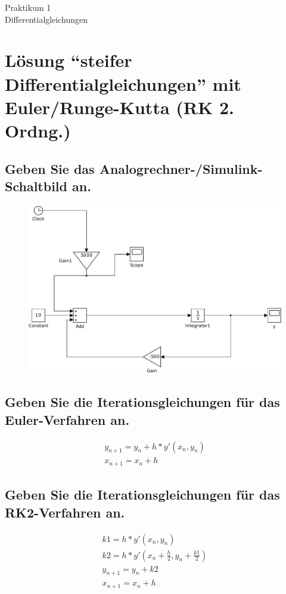 \documentclass[10pt,a4paper]{article}
\begin{document}
\begin{center}
\begin{LARGE}
Praktikum 1\\
Differentialgleichungen
\end{LARGE}
\end{center}

\section{Lösung  "`steifer Differentialgleichungen"' mit Euler/Runge-Kutta (RK 2. Ordng.)}

\subsection{Geben Sie das Analogrechner-/Simulink-Schaltbild an.}
\begin{figure}[H]
\centering
\includegraphics[width=0.9\linewidth]{../screenshots/1}
\end{figure}
\subsection{Geben Sie die Iterationsgleichungen für das Euler-Verfahren an.}
\begin{subequations}
\begin{align}
y_{n+1} = y_n + h * y'(x_n,y_n)\\
x_{n+1} = x_n + h
\end{align}
\end{subequations}

\subsection{Geben Sie die Iterationsgleichungen für das RK2-Verfahren an.}
\begin{subequations}
\begin{align}
k1 = h * y'(x_n,y_n)\\
k2 = h * y'(x_n + \frac{h}{2},y_n + \frac{k1}{2})\\
y_{n+1} = y_n + k2\\
x_{n+1} = x_n + h
\end{align}
\end{subequations}
\end{document}
